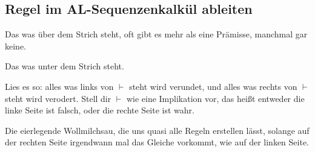 \documentclass[
    ngerman,
    color=3b,
    summary,
    boxarc,
    main,
    fleqn,
    leqno,
]{rubos-tuda-template}
\begin{document}
    \subsection{Regel im AL-Sequenzenkalkül ableiten}
    \begin{definition}[Prämisse]
        Das was über dem Strich steht, oft gibt es mehr als eine Prämisse, manchmal gar keine.
    \end{definition}
    \begin{definition}[Konklusion]
        Das was unter dem Strich steht.
    \end{definition}
    \begin{definition}[$\vdash$]
        Lies es so: alles was links von $\vdash$ steht wird verundet, und alles was rechts von $\vdash$ steht wird verodert. Stell dir $\vdash$ wie eine Implikation vor, das heißt entweder die linke Seite ist falsch, oder die rechte Seite ist wahr.
    \end{definition}
    \begin{definition}[Regel (Ax)]
        Die eierlegende Wollmilchsau, die uns quasi alle Regeln erstellen lässt, solange auf der rechten Seite irgendwann mal das Gleiche vorkommt, wie auf der linken Seite.
    \end{definition}
\end{document}
